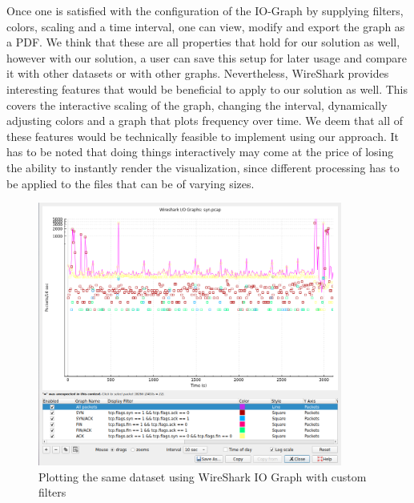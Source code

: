 Once one is satisfied with the configuration of the IO-Graph by supplying filters, colors, scaling and a time interval, one can view, modify and export the graph as a PDF. We think that these are all properties that hold for our solution as well, however with our solution, a user can save this setup for later usage and compare it with other datasets or with other graphs. Nevertheless, WireShark provides interesting features that would be beneficial to apply to our solution as well. This covers the interactive scaling of the graph, changing the interval, dynamically adjusting colors and a graph that plots frequency over time. We deem that all of these features would be technically feasible to implement using our approach. It has to be noted that doing things interactively may come at the price of losing the ability to instantly render the visualization, since different processing has to be applied to the files that can be of varying sizes.

\begin{figure}[]
    \centering
    \includegraphics[width=10cm]{images/evaluation_wireshark_iograph_synflood.png}
    \caption{Plotting the same dataset using WireShark IO Graph with custom filters}
    \label{fig:synvisualizationwireshark}
\end{figure}

